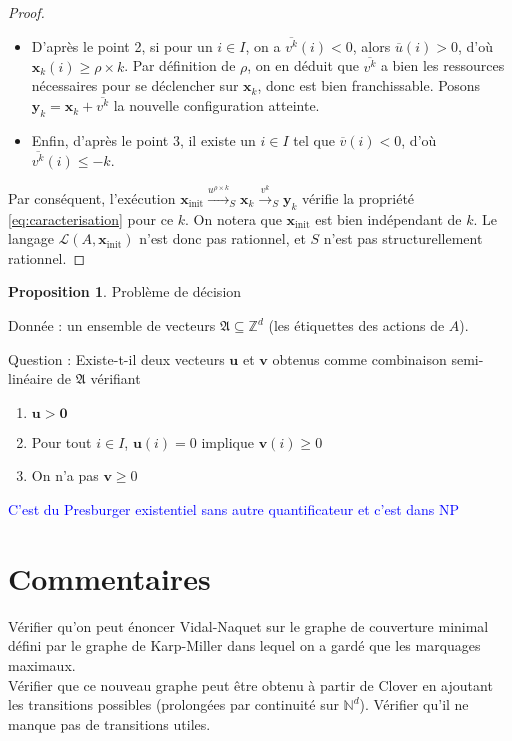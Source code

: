 \documentclass[a4paper,final]{article}
\theoremstyle{definition}
\newtheorem{Proposition}[Theorem]{Proposition}
\let\leq\leqslant
\let\geq\geqslant
\newcommand{\alain}[1]{\textcolor{blue}{#1}}
\newcommand{\N}{\ensuremath{\mathbb{N}}}
\newcommand{\Z}{\ensuremath{\mathbb{Z}}}
\newcommand{\lang}{\ensuremath{\mathcal{L}}}
\newcommand{\trans}[2]{\ensuremath{\stackrel{#1}{\longrightarrow}_{#2}}}
\newcommand{\vect}[1]{\ensuremath{\mathbf{#1}}}
\newcommand{\xinit}{\ensuremath{\vect{x}_\text{init}}}
\newcommand{\valeur}[1]{\ensuremath{\overline{#1}}}
\begin{document}
\begin{proof}
\begin{itemize}
    \item D'après le point 2, si pour un $i\in I$, on a $\valeur{v^k}(i) < 0$, alors $\valeur{u}(i) > 0$, d'où $\vect{x}_k(i) \geq \rho\times k$.
    Par définition de $\rho$, on en déduit que $\valeur{v^k}$ a bien les ressources nécessaires pour se déclencher sur $\vect{x}_k$, donc est bien franchissable.
    Posons $\vect{y}_k = \vect{x}_k + \valeur{v^k}$ la nouvelle configuration atteinte.
    
    \item Enfin, d'après le point 3, il existe un $i\in I$ tel que $\valeur{v}(i) < 0$, d'où $\valeur{v^k}(i) \leq -k$.
\end{itemize}
Par conséquent, l'exécution $\xinit \trans{u^{\rho\times k}}{S} \vect{x}_k \trans{v^k}{S} \vect{y}_k$ vérifie la propriété \eqref{eq:caracterisation} pour ce $k$.
On notera que $\xinit$ est bien indépendant de $k$.
Le langage $\lang(A,\xinit)$ n'est donc pas rationnel, et $S$ n'est pas structurellement rationnel.
\end{proof}

\begin{Proposition}
Problème de décision

Donnée : un ensemble de vecteurs $\mathfrak{A} \subseteq \Z^d$ (les étiquettes des actions de $A$).

Question : Existe-t-il deux vecteurs $\vect{u}$ et $\vect{v}$ obtenus comme combinaison semi-linéaire de $\mathfrak{A}$ vérifiant
\begin{enumerate}
    \item $\vect{u} > \vect{0}$
    \item Pour tout $i \in I$, $\vect{u}(i)=0$ implique $\vect{v}(i) \geq 0$
    \item On n'a pas $\vect{v} \geq 0$
\end{enumerate}

\end{Proposition}
\alain{C'est du Presburger existentiel sans autre quantificateur et c'est dans NP}

\section{Commentaires}
Vérifier qu'on peut énoncer Vidal-Naquet sur le graphe de couverture minimal défini par le graphe de Karp-Miller dans lequel on a gardé que les marquages maximaux.\\
Vérifier que ce nouveau graphe peut être obtenu à partir de Clover en ajoutant les transitions possibles (prolongées par continuité sur $\N^d$). Vérifier qu'il ne manque pas de transitions utiles.
\end{document}

